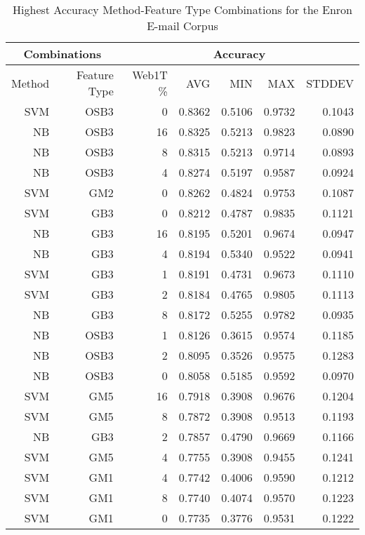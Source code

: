 	
	\begin{table}[htbp!]
			\begin{center}
			\begin{tabular}{ | r | r | r | r | r | r | r | }
			\hline
			\multicolumn{2}{|c|}{Combinations} & \multicolumn{5}{|c|}{Accuracy}\\
			\hline
			Method & Feature Type & Web1T \% & AVG & MIN & MAX & STDDEV\\ \hline 
			SVM & OSB3 & 0 & 0.8362 & 0.5106 & 0.9732 & 0.1043\\ \hline 
			NB & OSB3 & 16 & 0.8325 & 0.5213 & 0.9823 & 0.0890\\ \hline 
			NB & OSB3 & 8 & 0.8315 & 0.5213 & 0.9714 & 0.0893\\ \hline 
			NB & OSB3 & 4 & 0.8274 & 0.5197 & 0.9587 & 0.0924\\ \hline 
			SVM & GM2 & 0 & 0.8262 & 0.4824 & 0.9753 & 0.1087\\ \hline 
			SVM & GB3 & 0 & 0.8212 & 0.4787 & 0.9835 & 0.1121\\ \hline 
			NB & GB3 & 16 & 0.8195 & 0.5201 & 0.9674 & 0.0947\\ \hline 
			NB & GB3 & 4 & 0.8194 & 0.5340 & 0.9522 & 0.0941\\ \hline 
			SVM & GB3 & 1 & 0.8191 & 0.4731 & 0.9673 & 0.1110\\ \hline 
			SVM & GB3 & 2 & 0.8184 & 0.4765 & 0.9805 & 0.1113\\ \hline 
			NB & GB3 & 8 & 0.8172 & 0.5255 & 0.9782 & 0.0935\\ \hline 
			NB & OSB3 & 1 & 0.8126 & 0.3615 & 0.9574 & 0.1185\\ \hline 
			NB & OSB3 & 2 & 0.8095 & 0.3526 & 0.9575 & 0.1283\\ \hline 
			NB & OSB3 & 0 & 0.8058 & 0.5185 & 0.9592 & 0.0970\\ \hline 
			SVM & GM5 & 16 & 0.7918 & 0.3908 & 0.9676 & 0.1204\\ \hline 
			SVM & GM5 & 8 & 0.7872 & 0.3908 & 0.9513 & 0.1193\\ \hline 
			NB & GB3 & 2 & 0.7857 & 0.4790 & 0.9669 & 0.1166\\ \hline 
			SVM & GM5 & 4 & 0.7755 & 0.3908 & 0.9455 & 0.1241\\ \hline 
			SVM & GM1 & 4 & 0.7742 & 0.4006 & 0.9590 & 0.1212\\ \hline 
			SVM & GM1 & 8 & 0.7740 & 0.4074 & 0.9570 & 0.1223\\ \hline 
			SVM & GM1 & 0 & 0.7735 & 0.3776 & 0.9531 & 0.1222\\ \hline 

			\end{tabular}
		\caption{Highest Accuracy Method-Feature Type Combinations for the Enron E-mail Corpus}
		\label{tab:enron-accuracy-filtered-ranked}
		\end{center}
	\end{table}
	

